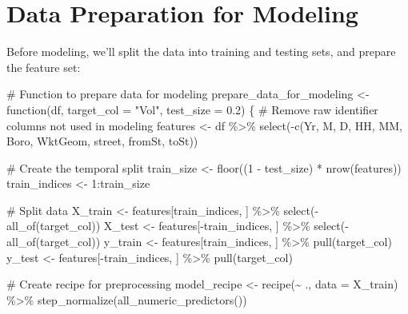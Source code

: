 \documentclass[
  letterpaper,
  DIV=11,
  numbers=noendperiod]{scrreprt}
\newenvironment{Shaded}{\begin{snugshade}}{\end{snugshade}}
\newcommand{\AttributeTok}[1]{\textcolor[rgb]{0.40,0.45,0.13}{#1}}
\newcommand{\CommentTok}[1]{\textcolor[rgb]{0.37,0.37,0.37}{#1}}
\newcommand{\ControlFlowTok}[1]{\textcolor[rgb]{0.00,0.23,0.31}{#1}}
\newcommand{\DecValTok}[1]{\textcolor[rgb]{0.68,0.00,0.00}{#1}}
\newcommand{\FloatTok}[1]{\textcolor[rgb]{0.68,0.00,0.00}{#1}}
\newcommand{\FunctionTok}[1]{\textcolor[rgb]{0.28,0.35,0.67}{#1}}
\newcommand{\NormalTok}[1]{\textcolor[rgb]{0.00,0.23,0.31}{#1}}
\newcommand{\OtherTok}[1]{\textcolor[rgb]{0.00,0.23,0.31}{#1}}
\newcommand{\SpecialCharTok}[1]{\textcolor[rgb]{0.37,0.37,0.37}{#1}}
\newcommand{\StringTok}[1]{\textcolor[rgb]{0.13,0.47,0.30}{#1}}
\begin{document}
\section{Data Preparation for
Modeling}\label{data-preparation-for-modeling}

Before modeling, we'll split the data into training and testing sets,
and prepare the feature set:

\begin{Shaded}
\begin{Highlighting}[]
\CommentTok{\# Function to prepare data for modeling}
\NormalTok{prepare\_data\_for\_modeling }\OtherTok{\textless{}{-}} \ControlFlowTok{function}\NormalTok{(df, }\AttributeTok{target\_col =} \StringTok{"Vol"}\NormalTok{, }\AttributeTok{test\_size =} \FloatTok{0.2}\NormalTok{) \{}
  \CommentTok{\# Remove raw identifier columns not used in modeling}
\NormalTok{  features }\OtherTok{\textless{}{-}}\NormalTok{ df }\SpecialCharTok{\%\textgreater{}\%}
    \FunctionTok{select}\NormalTok{(}\SpecialCharTok{{-}}\FunctionTok{c}\NormalTok{(Yr, M, D, HH, MM, Boro, WktGeom, street, fromSt, toSt))}
  
  \CommentTok{\# Create the temporal split}
\NormalTok{  train\_size }\OtherTok{\textless{}{-}} \FunctionTok{floor}\NormalTok{((}\DecValTok{1} \SpecialCharTok{{-}}\NormalTok{ test\_size) }\SpecialCharTok{*} \FunctionTok{nrow}\NormalTok{(features))}
\NormalTok{  train\_indices }\OtherTok{\textless{}{-}} \DecValTok{1}\SpecialCharTok{:}\NormalTok{train\_size}
  
  \CommentTok{\# Split data}
\NormalTok{  X\_train }\OtherTok{\textless{}{-}}\NormalTok{ features[train\_indices, ] }\SpecialCharTok{\%\textgreater{}\%} \FunctionTok{select}\NormalTok{(}\SpecialCharTok{{-}}\FunctionTok{all\_of}\NormalTok{(target\_col))}
\NormalTok{  X\_test }\OtherTok{\textless{}{-}}\NormalTok{ features[}\SpecialCharTok{{-}}\NormalTok{train\_indices, ] }\SpecialCharTok{\%\textgreater{}\%} \FunctionTok{select}\NormalTok{(}\SpecialCharTok{{-}}\FunctionTok{all\_of}\NormalTok{(target\_col))}
\NormalTok{  y\_train }\OtherTok{\textless{}{-}}\NormalTok{ features[train\_indices, ] }\SpecialCharTok{\%\textgreater{}\%} \FunctionTok{pull}\NormalTok{(target\_col)}
\NormalTok{  y\_test }\OtherTok{\textless{}{-}}\NormalTok{ features[}\SpecialCharTok{{-}}\NormalTok{train\_indices, ] }\SpecialCharTok{\%\textgreater{}\%} \FunctionTok{pull}\NormalTok{(target\_col)}
  
  \CommentTok{\# Create recipe for preprocessing}
\NormalTok{  model\_recipe }\OtherTok{\textless{}{-}} \FunctionTok{recipe}\NormalTok{(}\SpecialCharTok{\textasciitilde{}}\NormalTok{ ., }\AttributeTok{data =}\NormalTok{ X\_train) }\SpecialCharTok{\%\textgreater{}\%}
    \FunctionTok{step\_normalize}\NormalTok{(}\FunctionTok{all\_numeric\_predictors}\NormalTok{())}
  

\end{Highlighting}
\end{Shaded}
\end{document}
